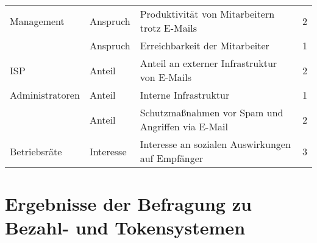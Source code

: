 \begin{table}[H]
\begin{tabular}{|l|l|l|l|}
    Management            & Anspruch           & Produktivität von Mitarbeitern trotz E-Mails                       & 2                  \\ \cline{2-4} 
                                           & Anspruch           & Erreichbarkeit der Mitarbeiter                                     & 1                  \\ \hline
    ISP                                    & Anteil             & Anteil an externer Infrastruktur von E-Mails         & 2                  \\ \hline
    Administratoren & Anteil             & Interne Infrastruktur                                              & 1                  \\ \cline{2-4} 
                                           & Anteil             & Schutzmaßnahmen vor Spam und Angriffen via E-Mail                  & 2                  \\ \hline
    Betriebsräte                           & Interesse          & Interesse an sozialen Auswirkungen auf Empfänger & 3                  \\ \hline
    \end{tabular}
	\label{tab:stakeholderanalyse}
\end{table}


\section{Ergebnisse der Befragung zu Bezahl- und Tokensystemen}

